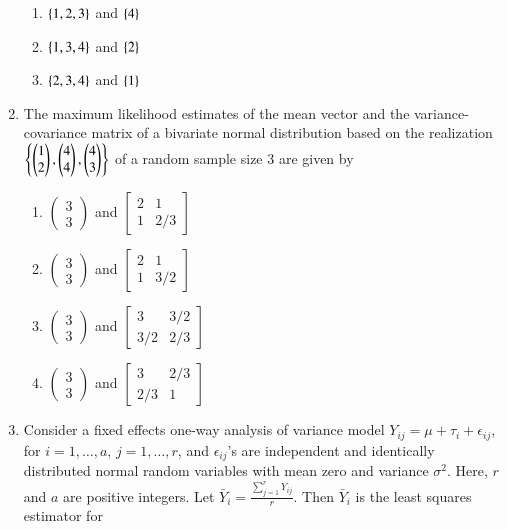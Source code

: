 \documentclass[journal]{IEEEtran}
\begin{document}
\begin{enumerate}
\begin{enumerate}
    \item $\left\{1, 2, 3\right\}$ and $\left\{4\right\}$
    \item $\left\{1, 3, 4\right\}$ and $\left\{2\right\}$
    \item $\left\{2, 3, 4\right\}$ and $\left\{1\right\}$
\end{enumerate}
\item The maximum likelihood estimates of the mean vector and the variance-covariance matrix of a bivariate normal distribution based on the realization $\left\{\begin{pmatrix}1\\2\end{pmatrix}, \begin{pmatrix}4\\4\end{pmatrix}, \begin{pmatrix}4\\3\end{pmatrix}\right\}$ of a random sample size 3 are given by
\begin{enumerate}
    \item $\begin{pmatrix} 3 \\ 3 \end{pmatrix}$ and $\begin{bmatrix} 2 & 1 \\ 1 & 2/3 \end{bmatrix}$
    \item $\begin{pmatrix} 3 \\ 3 \end{pmatrix}$ and $\begin{bmatrix} 2 & 1 \\ 1 & 3/2 \end{bmatrix}$
    \item $\begin{pmatrix} 3 \\ 3 \end{pmatrix}$ and $\begin{bmatrix} 3 & 3/2 \\ 3/2 & 2/3 \end{bmatrix}$
    \item $\begin{pmatrix} 3 \\ 3 \end{pmatrix}$ and $\begin{bmatrix} 3 & 2/3 \\ 2/3 & 1 \end{bmatrix}$
\end{enumerate}
\item Consider a fixed effects one-way analysis of variance model $Y_{ij} = \mu + \tau_i + \epsilon_{ij}$, for $i = 1, \dots, a$, $j = 1, \dots, r$, and $\epsilon_{ij}$'s are independent and identically distributed normal random variables with mean zero and variance $\sigma^2$. Here, $r$ and $a$ are positive integers. Let $\bar{Y}_i = \frac{\sum_{j=1}^r Y_{ij}}{r}$. Then $\bar{Y}_i$ is the least squares estimator for

\end{enumerate}
\end{document}
